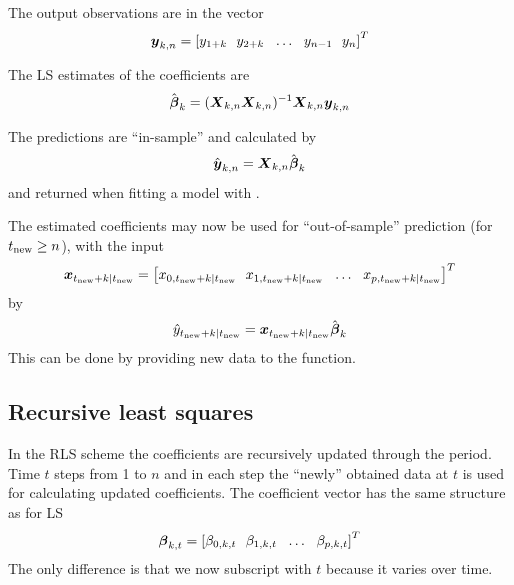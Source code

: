 \begin{appendix}
The output observations are in the vector
\begin{align}
  \mbox{\boldmath{$y$}}_{k,n} =\left[ y_{1+k} ~~
    y_{2+k} ~~ \dots ~~ y_{n-1} ~~ y_{n}\right]^T
\end{align}

The LS estimates of the coefficients are
\begin{align}
  \hat{\mbox{\boldmath{$\beta$}}}_{k} = (\mbox{\boldmath{$X$}}_{k,n}\mbox{\boldmath{$X$}}_{k,n})^{-1} \mbox{\boldmath{$X$}}_{k,n}\mbox{\boldmath{$y$}}_{k,n}
\end{align}

The predictions are ``in-sample'' and calculated by
\begin{align}
  \hat{\mbox{\boldmath{$y$}}}_{k,n} = \mbox{\boldmath{$X$}}_{k,n} \hat{\mbox{\boldmath{$\beta$}}}_{k}
\end{align}
and returned when fitting a model with .

The estimated coefficients may now be used for ``out-of-sample'' prediction (for
$t_{\mathrm{new}} \geq n$), with the input
\begin{align}
  \mbox{\boldmath{$x$}}_{t_{\mathrm{new}}+k|t_{\mathrm{new}}} = \left[ x_{0,t_{\mathrm{new}}+k|t_{\mathrm{new}}} ~~ x_{1,t_{\mathrm{new}}+k|t_{\mathrm{new}}} ~~ \dots ~~
    x_{p,t_{\mathrm{new}}+k|t_{\mathrm{new}}} \right]^T
\end{align}
by
\begin{align}
  \hat{y}_{t_{\mathrm{new}}+k|t_{\mathrm{new}}} = \mbox{\boldmath{$x$}}_{t_{\mathrm{new}}+k|t_{\mathrm{new}}} \hat{\mbox{\boldmath{$\beta$}}}_{k} 
\end{align}
This can be done by providing new data to the  function.



\subsection{Recursive least squares}

In the RLS scheme the coefficients are recursively updated through the
period. Time $t$ steps from 1 to $n$ and in each step the ``newly'' obtained
data at $t$ is used for calculating updated coefficients. The coefficient vector
has the same structure as for LS
\begin{align}
  \mbox{\boldmath{$\beta$}}_{k,t} =\left[ \beta_{0,k,t} ~~ \beta_{1,k,t} ~~ \dots ~~ \beta_{p,k,t} \right]^T
\end{align}
The only difference is that we now subscript with $t$ because it varies over
time.


\end{appendix}
